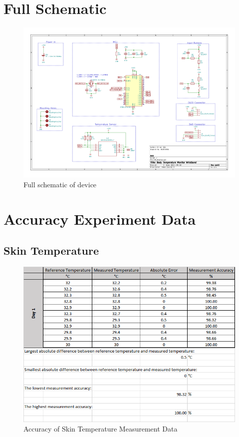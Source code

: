 \appendix
\chapter{Full Schematic}\label{FSchematic}

\begin{figure}[H]
	\centering
	\includegraphics[scale=0.7, angle=90]{img/Schematic}
	\caption{Full schematic of device}
\end{figure}

\chapter{Accuracy Experiment Data}\label{Exp-Data}
\section{Skin Temperature}
\begin{figure}[H]
	\centering
	\includegraphics[scale=0.7]{img/Skin-Temp-Data.png}
	\caption{Accuracy of Skin Temperature Measurement Data}
\end{figure}

